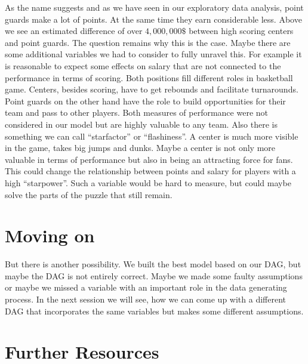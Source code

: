 \documentclass[
]{book}
\begin{document}
As the name suggests and as we have seen in our exploratory data analysis,
point guards make a lot of points. At the same time they earn considerable less.
Above we see an estimated difference of over \(4,000,000\$\) between high scoring
centers and point guards. The question remains why this is the case.
Maybe there are some additional variables we had to consider to fully unravel
this.
For example it is reasonable to expect some effects on salary that are not
connected to the performance in terms of scoring. Both positions fill different
roles in basketball game. Centers, besides scoring, have to get rebounds and
facilitate turnarounds. Point guards on the other hand have the role to build
opportunities for their team and pass to other players. Both measures of
performance were not considered in our model but are highly valuable to any team.
Also there is something we can call ``starfactor'' or ``flashiness''. A center is
much more visible in the game, takes big jumps and dunks. Maybe a center is not
only more valuable in terms of performance but also in being an attracting force
for fans. This could change the relationship between points and salary for
players with a high ``starpower''. Such a variable would be hard to measure,
but could maybe solve the parts of the puzzle that still remain.

\hypertarget{moving-on-2}{%
\section{Moving on}\label{moving-on-2}}

But there is another possibility. We built the best model based on our DAG, but
maybe the DAG is not entirely correct. Maybe we made some faulty assumptions or
maybe we missed a variable with an important role in the data generating
process. In the next session we will see, how we can come up with a different
DAG that incorporates the same variables but makes some different assumptions.

\hypertarget{further-resources-4}{%
\section{Further Resources}\label{further-resources-4}}
\end{document}
